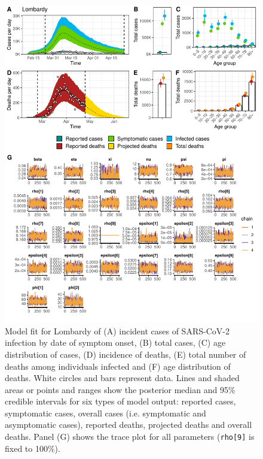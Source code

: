 \documentclass{article}
\begin{document}
\begin{figure}[h]
	\centering
	\includegraphics[width=\linewidth]{../format_output/figures_v3/supp_fit_lombardy.pdf}
	\caption{Model fit for Lombardy of (A) incident cases of SARS-CoV-2 infection by date of symptom onset, (B) total cases, (C) age distribution of cases, (D) incidence of deaths, (E) total number of deaths among individuals infected and (F) age distribution of deaths. White circles and bars represent data. Lines and shaded areas or points and ranges show the posterior median and 95\% credible intervals for six types of model output: reported cases, symptomatic cases, overall cases (i.e. symptomatic and asymptomatic cases), reported deaths, projected deaths and overall deaths. Panel (G) shows the trace plot for all parameters (\texttt{rho[9]} is fixed to 100\%).}

\end{figure}
\end{document}
